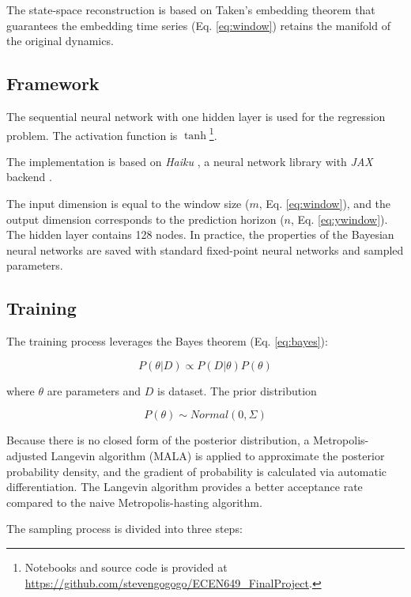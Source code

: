 \documentclass{article}
\begin{document}
The state-space reconstruction is based on Taken's embedding theorem that guarantees the embedding time series (Eq. \ref{eq:window}) retains the manifold of the original dynamics\cite{takens1981detecting}.

\subsection{Framework}

The sequential neural network with one hidden layer is used for the regression problem. The activation function is $\tanh$\footnote{Notebooks and source code is provided at \url{https://github.com/stevengogogo/ECEN649_FinalProject}.}.

The implementation is based on \textit{Haiku} \cite{haiku2020github}, a neural network library with \textit{JAX} backend \cite{jax2018github}.


The input dimension is equal to the window size ($m$, Eq. \ref{eq:window}), and the output dimension corresponds to the prediction horizon ($n$, Eq. \ref{eq:ywindow}). The hidden layer contains 128 nodes. In practice, the properties of the Bayesian neural networks are saved with standard fixed-point neural networks and sampled parameters.


\subsection{Training}

The training process leverages the Bayes theorem (Eq. \ref{eq:bayes}):

\begin{equation}
P(\theta | D) \propto P(D|\theta) P(\theta)
\label{eq:bayes}
\end{equation}

where $\theta$ are parameters and $D$ is dataset. The prior distribution 

\begin{equation}
P(\theta) \sim Normal(0, \Sigma)
\end{equation}


Because there is no closed form of the posterior distribution, a Metropolis-adjusted Langevin algorithm (MALA) is applied to approximate the posterior probability density, and the gradient of probability is calculated via automatic differentiation. The Langevin algorithm provides a better acceptance rate compared to the naive Metropolis-hasting algorithm\cite{roberts1998optimal}. 

The sampling process is divided into three steps:
\end{document}
